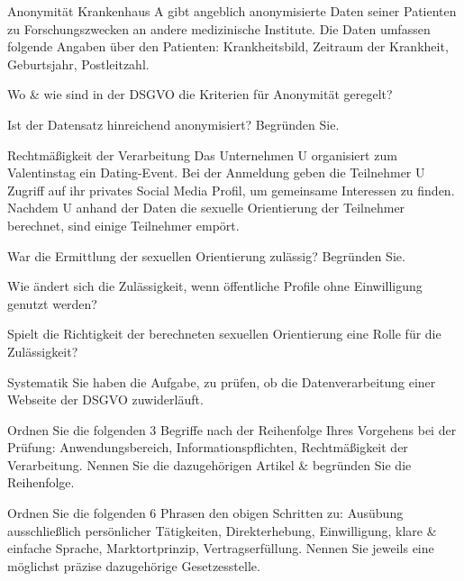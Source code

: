 \documentclass{exercisesheet}
\begin{document}
\begin{eexercises}{Anonymität}{
    Krankenhaus A gibt angeblich anonymisierte Daten seiner Patienten zu Forschungszwecken an andere medizinische Institute. Die Daten umfassen folgende Angaben über den Patienten: Krankheitsbild, Zeitraum der Krankheit, Geburtsjahr, Postleitzahl.
  }
  \item Wo \& wie sind in der DSGVO die Kriterien für Anonymität geregelt?
  \item Ist der Datensatz hinreichend anonymisiert? Begründen Sie.
\end{eexercises}

\begin{eexercises}{Rechtmäßigkeit der Verarbeitung}{
    Das Unternehmen U organisiert zum Valentinstag ein Dating-Event. Bei der Anmeldung geben die Teilnehmer U Zugriff auf ihr privates Social Media Profil, um gemeinsame Interessen zu finden. Nachdem U anhand der Daten die sexuelle Orientierung der Teilnehmer berechnet, sind einige Teilnehmer empört.
  }
  \item War die Ermittlung der sexuellen Orientierung zulässig? Begründen Sie.
  \item Wie ändert sich die Zulässigkeit, wenn öffentliche Profile ohne Einwilligung genutzt werden?
  \item Spielt die Richtigkeit der berechneten sexuellen Orientierung eine Rolle für die Zulässigkeit?
\end{eexercises}

\begin{eexercises}{Systematik}{
    Sie haben die Aufgabe, zu prüfen, ob die Datenverarbeitung einer Webseite der DSGVO zuwiderläuft.
  }
  \item Ordnen Sie die folgenden 3 Begriffe nach der Reihenfolge Ihres Vorgehens bei der Prüfung: Anwendungsbereich, Informationspflichten, Rechtmäßigkeit der Verarbeitung. Nennen Sie die dazugehörigen Artikel \& begründen Sie die Reihenfolge.
  \item Ordnen Sie die folgenden 6 Phrasen den obigen Schritten zu: Ausübung ausschließlich persönlicher Tätigkeiten, Direkterhebung, Einwilligung, klare \& einfache Sprache, Marktortprinzip, Vertragserfüllung. Nennen Sie jeweils eine möglichst präzise dazugehörige Gesetzesstelle.
\end{eexercises}
\end{document}
